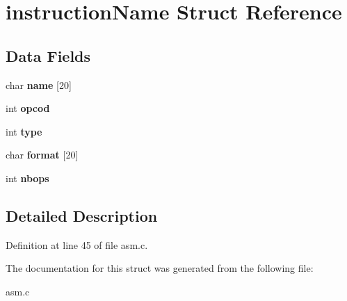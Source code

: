 \section{instruction\+Name Struct Reference}
\label{structinstruction_name}
\subsection*{Data Fields}
\begin{DoxyCompactItemize}
\item 
\mbox{\label{structinstruction_name_a9997d8ee2df51d18efed254a5aa016fd}} 
char {\bfseries name} [20]
\item 
\mbox{\label{structinstruction_name_a87e59bd69d9de26089c9d13e5c75c086}} 
int {\bfseries opcod}
\item 
\mbox{\label{structinstruction_name_ac765329451135abec74c45e1897abf26}} 
int {\bfseries type}
\item 
\mbox{\label{structinstruction_name_adc90e59b2cbaeed86c8a6ac1015c4f85}} 
char {\bfseries format} [20]
\item 
\mbox{\label{structinstruction_name_a34aaf7e4790814fce09b357e1de1a4da}} 
int {\bfseries nbops}
\end{DoxyCompactItemize}


\subsection{Detailed Description}


Definition at line 45 of file asm.\+c.



The documentation for this struct was generated from the following file\+:\begin{DoxyCompactItemize}
\item 
asm.\+c\end{DoxyCompactItemize}
